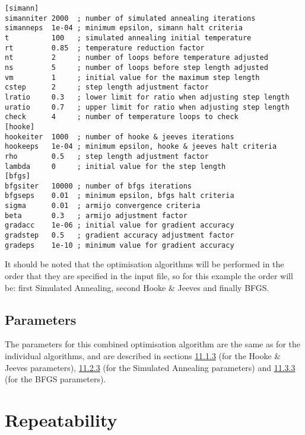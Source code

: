 \documentclass[]{book}
\begin{document}
\begin{verbatim}
[simann]
simanniter 2000  ; number of simulated annealing iterations
simanneps  1e-04 ; minimum epsilon, simann halt criteria
t          100   ; simulated annealing initial temperature
rt         0.85  ; temperature reduction factor
nt         2     ; number of loops before temperature adjusted
ns         5     ; number of loops before step length adjusted
vm         1     ; initial value for the maximum step length
cstep      2     ; step length adjustment factor
lratio     0.3   ; lower limit for ratio when adjusting step length
uratio     0.7   ; upper limit for ratio when adjusting step length
check      4     ; number of temperature loops to check
[hooke]
hookeiter  1000  ; number of hooke & jeeves iterations
hookeeps   1e-04 ; minimum epsilon, hooke & jeeves halt criteria
rho        0.5   ; step length adjustment factor
lambda     0     ; initial value for the step length
[bfgs]
bfgsiter   10000 ; number of bfgs iterations
bfgseps    0.01  ; minimum epsilon, bfgs halt criteria
sigma      0.01  ; armijo convergence criteria
beta       0.3   ; armijo adjustment factor
gradacc    1e-06 ; initial value for gradient accuracy
gradstep   0.5   ; gradient accuracy adjustment factor
gradeps    1e-10 ; minimum value for gradient accuracy
\end{verbatim}

It should be noted that the optimisation algorithms will be performed in
the order that they are specified in the input file, so for this example
the order will be: first Simulated Annealing, second Hooke \& Jeeves and
finally BFGS.

\hypertarget{subsec:combinepar}{%
\subsection{Parameters}\label{subsec:combinepar}}

The parameters for this combined optimisation algorithm are the same as
for the individual algorithms, and are described in sections
\protect\hyperlink{subsec:hookepar}{11.1.3} (for the Hooke \& Jeeves parameters),
\protect\hyperlink{subsec:simannpar}{11.2.3} (for the Simulated Annealing parameters)
and \protect\hyperlink{subsec:bfgspar}{11.3.3} (for the BFGS parameters).

\hypertarget{sec:repeat}{%
\section{Repeatability}\label{sec:repeat}}
\end{document}
